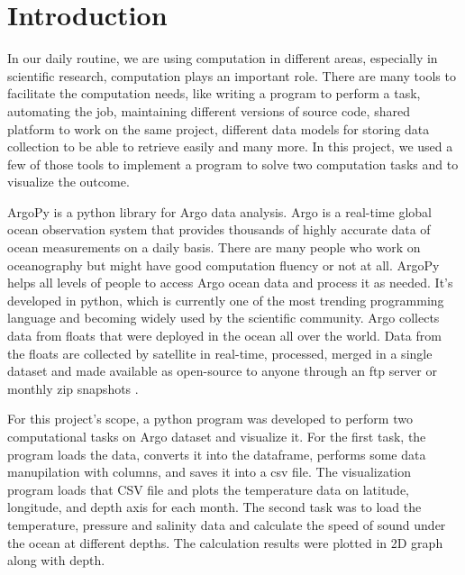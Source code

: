 \section{Introduction}

In our daily routine, we are using computation in different areas, especially in scientific research, computation plays an important role. There are many tools to facilitate the computation needs, like writing a program to perform a task, automating the job, maintaining different versions of source code,  shared platform to work on the same project, different data models for storing data collection to be able to retrieve easily and many more. In this project, we used a few of those tools to implement a program to solve two computation tasks and to visualize the outcome.\newline 

\noindent ArgoPy is a python library for Argo data analysis. Argo is a real-time global ocean observation system that provides thousands of highly accurate data of ocean measurements on a daily basis. There are many people who work on oceanography but might have good computation fluency or not at all. ArgoPy helps all levels of people to access Argo ocean data and process it as needed. It’s developed in python, which is currently one of the most trending programming language and becoming widely used by the scientific community. Argo collects data from floats that were deployed in the ocean all over the world. Data from the floats are collected by satellite in real-time, processed, merged in a single dataset and made available as open-source to anyone through an ftp server or monthly zip snapshots \cite{argopy}.\newline

\noindent For this project's scope, a python program was developed to perform two computational tasks on Argo dataset and visualize it. For the first task, the program loads the data, converts it into the dataframe, performs some data manupilation with columns, and saves it into a csv file. The visualization program loads that CSV file and plots the temperature data on latitude, longitude, and depth axis for each month. The second task was to load the temperature, pressure and salinity data and calculate the speed of sound under the ocean at different depths. The calculation results were plotted in 2D graph along with depth.\newline

